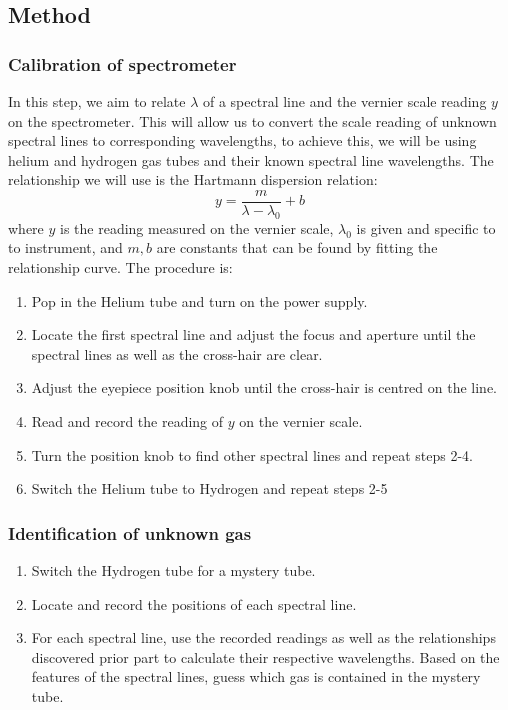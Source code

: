 \documentclass[12pt]{article}
\begin{document}
\subsection{Method} 
\subsubsection{Calibration of spectrometer}
In this step, we aim to relate $\lambda$ of a spectral line and the vernier scale reading $y$ on the spectrometer. This will allow us to convert the scale reading of unknown spectral lines to corresponding wavelengths, to achieve this, we will be using helium and hydrogen gas tubes and their known spectral line wavelengths. The relationship we will use is the Hartmann dispersion relation: \autocite{manuall}
\begin{equation}
    y=\frac{m}{\lambda-\lambda_0}+b
    \label{eq:hartmann}
\end{equation}
where $y$ is the reading measured on the vernier scale, $\lambda_0$ is given and specific to to instrument, and $m,b$ are constants that can be found by fitting the relationship curve. The procedure is:
\begin{enumerate}
    \item Pop in the Helium tube and turn on the power supply.
    \item Locate the first spectral line and adjust the focus and aperture until the spectral lines as well as the cross-hair are clear.
    \item Adjust the eyepiece position knob until the cross-hair is centred on the line.
    \item Read and record the reading of $y$ on the vernier scale.
    \item Turn the position knob to find other spectral lines and repeat steps 2-4.
    \item Switch the Helium tube to Hydrogen and repeat steps 2-5
\end{enumerate}
\subsubsection{Identification of unknown gas}
\begin{enumerate}
    \item Switch the Hydrogen tube for a mystery tube.
    \item Locate and record the positions of each spectral line.
    \item For each spectral line, use the recorded readings as well as the relationships discovered prior part to calculate their respective wavelengths. Based on the features of the spectral lines, guess which gas is contained in the mystery tube.
\end{enumerate}
\end{document}
